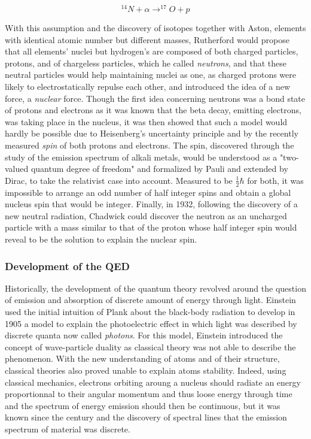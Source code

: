 	\begin{equation}
		\label{eq:nuclear}
		^{14}N + \alpha \rightarrow ^{17}O + p
	\end{equation}
	
	With this assumption and the discovery of isotopes together with Aston, elements with identical atomic number but different masses, Rutherford would propose that all elements' nuclei but hydrogen's are composed of both charged particles, protons, and of chargeless particles, which he called \textit{neutrons}, and that these neutral particles would help maintaining nuclei as one, as charged protons were likely to electrostatically repulse each other, and introduced the idea of a new force, a \textit{nuclear} force. Though the first idea concerning neutrons was a bond state of protons and electrons as it was known that the beta decay, emitting electrons, was taking place in the nucleus, it was then showed that such a model would hardly be possible due to Heisenberg's uncertainty principle and by the recently measured \textit{spin} of both protons and electrons. The spin, discovered through the study of the emission spectrum of alkali metals, would be understood as a "two-valued quantum degree of freedom" and formalized by Pauli and extended by Dirac, to take the relativist case into account. Measured to be $\frac{1}{2} \hbar$ for both, it was impossible to arrange an odd number of half integer spins and obtain a global nucleus spin that would be integer. Finally, in 1932, following the discovery of a new neutral radiation, Chadwick could discover the neutron as an uncharged particle with a mass similar to that of the proton whose half integer spin would reveal to be the solution to explain the nuclear spin.
	
	\subsubsection*{Development of the \acl{QED}}
	\label{chapt2:sssec:QED}
	
	Historically, the development of the quantum theory revolved around the question of emission and absorption of discrete amount of energy through light. Einstein used the initial intuition of Plank about the black-body radiation to develop in 1905 a model to explain the photoelectric effect in which light was described by discrete quanta now called \textit{photons}. For this model, Einstein introduced the concept of wave-particle duality as classical theory was not able to describe the phenomenon. With the new understanding of atoms and of their structure, classical theories also proved unable to explain atoms stability. Indeed, using classical mechanics, electrons orbiting aroung a nucleus should radiate an energy proportionnal to their angular momentum and thus loose energy through time and the spectrum of energy emission should then be continuous, but it was known since the  century and the discovery of spectral lines that the emission spectrum of material was discrete.
	
